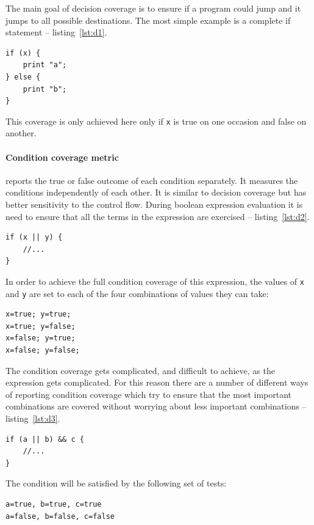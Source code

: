 The main goal of decision coverage is to ensure if a program could jump and it jumps to all possible destinations. The most simple example is a complete if statement -- listing~\ref{lst:d1}.
\begin{lstlisting}[caption=Decision coverage metric passes,label=lst:d1]
if (x) {
	print "a";
} else {
	print "b";
}
\end{lstlisting}
This coverage is only achieved here only if \texttt{x} is true on one occasion and false on another.

\paragraph{Condition coverage metric} reports the true or false outcome of each condition separately. It measures the conditions independently of each other. It is similar to decision coverage but has better sensitivity to the control flow. During boolean expression evaluation it is need to ensure that all the terms in the expression are exercised -- listing~\ref{lst:d2}.

\begin{lstlisting}[caption=Simple conditional coverage, label=lst:d2]
if (x || y) {
	//...
} 
\end{lstlisting}

In order to achieve the full condition coverage of this expression, the values of \texttt{x} and \texttt{y} are set to each of the four combinations of values they can take:

\begin{verbatim} 
x=true; y=true;
x=true; y=false;
x=false; y=true;
x=false; y=false;
\end{verbatim} 

The condition coverage gets complicated, and difficult to achieve, as the expression gets complicated. For this reason there are a number of different ways of reporting condition coverage which try to ensure that the most important combinations are covered without worrying about less important combinations -- listing~\ref{lst:d3}.

\begin{lstlisting}[caption=Complex conditional coverage, label=lst:d3]
if (a || b) && c {
	//...
}
\end{lstlisting}

The condition will be satisfied by the following set of tests:
\begin{verbatim} 
a=true, b=true, c=true
a=false, b=false, c=false
\end{verbatim} 

